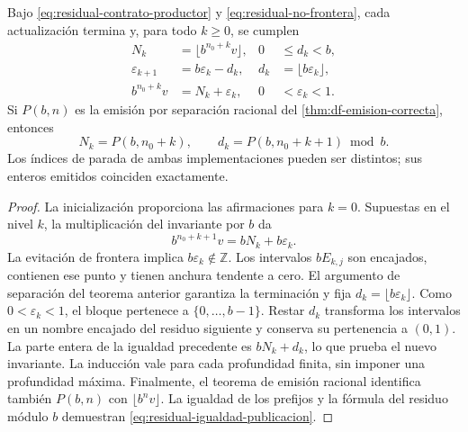 \begin{theorem}
\label{thm:residual-compatibilidad-universal}
Bajo \eqref{eq:residual-contrato-productor} y
\eqref{eq:residual-no-frontera}, cada actualización termina y, para todo
\(k\geq0\), se cumplen
\begin{align}
 N_k&=\lfloor b^{n_0+k}v\rfloor,
 &0&\leq d_k<b,\label{eq:residual-prefijos-k}\\
 \varepsilon_{k+1}&=b\varepsilon_k-d_k,
 &d_k&=\lfloor b\varepsilon_k\rfloor,\label{eq:residual-recurrencia}\\
 b^{n_0+k}v&=N_k+\varepsilon_k,
 &0&<\varepsilon_k<1.\label{eq:residual-invariante}
\end{align}
Si \(P(b,n)\) es la emisión por separación racional del
\cref{thm:df-emision-correcta}, entonces
\begin{equation}
 N_k=P(b,n_0+k),\qquad
 d_k=P(b,n_0+k+1)\bmod b.
 \label{eq:residual-igualdad-publicacion}
\end{equation}
Los índices de parada de ambas implementaciones pueden ser distintos;
sus enteros emitidos coinciden exactamente.
\end{theorem}
\begin{proof}
La inicialización proporciona las afirmaciones para \(k=0\). Supuestas
en el nivel \(k\), la multiplicación del invariante por \(b\) da
\[
 b^{n_0+k+1}v=bN_k+b\varepsilon_k.
\]
La evitación de frontera implica \(b\varepsilon_k\notin\mathbb Z\).
Los intervalos \(bE_{k,j}\) son encajados, contienen ese punto y tienen
anchura tendente a cero. El argumento de separación del teorema anterior
garantiza la terminación y fija
\(d_k=\lfloor b\varepsilon_k\rfloor\). Como
\(0<\varepsilon_k<1\), el bloque pertenece a
\(\{0,\ldots,b-1\}\). Restar \(d_k\) transforma los intervalos en
un nombre encajado del residuo siguiente y conserva su pertenencia a
\((0,1)\). La parte entera de la igualdad precedente es
\(bN_k+d_k\), lo que prueba el nuevo invariante. La inducción vale para
cada profundidad finita, sin imponer una profundidad máxima.
Finalmente, el teorema de emisión racional identifica también
\(P(b,n)\) con \(\lfloor b^n v\rfloor\). La igualdad de los
prefijos y la fórmula del residuo módulo \(b\) demuestran
\eqref{eq:residual-igualdad-publicacion}.
\end{proof}


